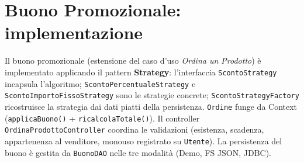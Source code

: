 \section{Buono Promozionale: implementazione}
\label{sec:buono}

Il buono promozionale (estensione del caso d'uso \emph{Ordina un Prodotto}) è implementato applicando il pattern \textbf{Strategy}: l'interfaccia \texttt{ScontoStrategy} incapsula l'algoritmo; \texttt{ScontoPercentualeStrategy} e \texttt{ScontoImportoFissoStrategy} sono le strategie concrete; \texttt{ScontoStrategyFactory} ricostruisce la strategia dai dati piatti della persistenza. \texttt{Ordine} funge da Context (\texttt{applicaBuono()} + \texttt{ricalcolaTotale()}). Il controller \texttt{OrdinaProdottoController} coordina le validazioni (esistenza, scadenza, appartenenza al venditore, monouso registrato su \texttt{Utente}). La persistenza del buono è gestita da \texttt{BuonoDAO} nelle tre modalità (Demo, FS JSON, JDBC).
